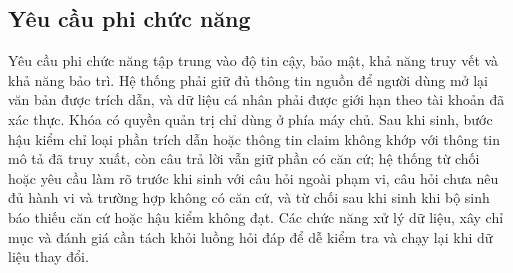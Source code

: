 \documentclass[12pt,a4paper,oneside]{report}
\begin{document}
\subsection{Yêu cầu phi chức năng}
Yêu cầu phi chức năng tập trung vào độ tin cậy, bảo mật, khả năng truy vết và khả năng bảo trì. Hệ thống phải giữ đủ thông tin nguồn để người dùng mở lại văn bản được trích dẫn, và dữ liệu cá nhân phải được giới hạn theo tài khoản đã xác thực. Khóa có quyền quản trị chỉ dùng ở phía máy chủ. Sau khi sinh, bước hậu kiểm chỉ loại phần trích dẫn hoặc thông tin claim không khớp với thông tin mô tả đã truy xuất, còn câu trả lời vẫn giữ phần có căn cứ; hệ thống từ chối hoặc yêu cầu làm rõ trước khi sinh với câu hỏi ngoài phạm vi, câu hỏi chưa nêu đủ hành vi và trường hợp không có căn cứ, và từ chối sau khi sinh khi bộ sinh báo thiếu căn cứ hoặc hậu kiểm không đạt. Các chức năng xử lý dữ liệu, xây chỉ mục và đánh giá cần tách khỏi luồng hỏi đáp để dễ kiểm tra và chạy lại khi dữ liệu thay đổi.
\end{document}
